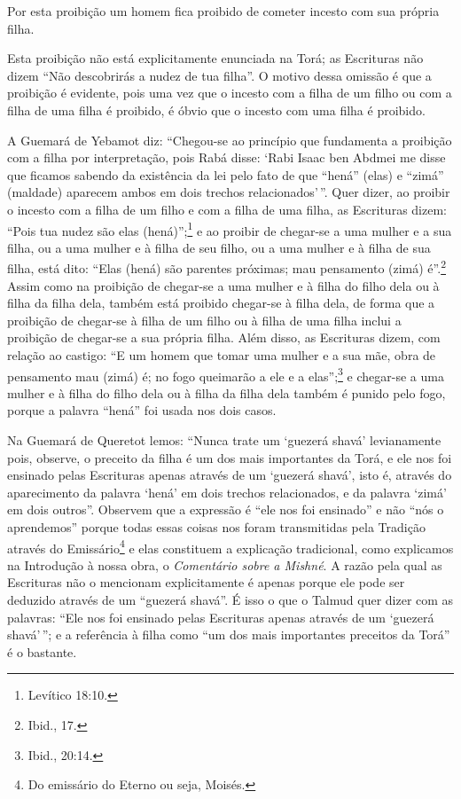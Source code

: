Por esta proibição um homem fica proibido de cometer incesto com sua
própria filha.

Esta proibição não está explicitamente enunciada na Torá; as
Escrituras não dizem ``Não descobrirás a nudez de tua filha''. O motivo
dessa omissão é que a proibição é evidente, pois uma vez que o incesto
com a filha de um filho ou com a filha de uma filha é proibido, é óbvio
que o incesto com uma filha é proibido.

A Guemará de Yebamot diz: ``Chegou-se ao princípio que fundamenta a
proibição com a filha por interpretação, pois Rabá disse: `Rabi Isaac
ben Abdmei me disse que ficamos sabendo da existência da lei pelo fato
de que ``hená'' (elas) e ``zimá'' (maldade) aparecem ambos em dois
trechos relacionados'\,''. Quer dizer, ao proibir o incesto com a filha de
um filho e com a filha de uma filha, as Escrituras dizem: ``Pois tua
nudez são elas (hená)'';\footnote{Levítico 18:10.} e ao proibir de chegar-se a
uma mulher e a sua filha, ou a uma mulher e à filha de seu filho, ou a
uma mulher e à filha de sua filha, está dito: ``Elas (hená) são parentes
próximas; mau pensamento (zimá) é''.\footnote{Ibid., 17.} Assim como na proibição
de chegar-se a uma mulher e à filha do filho dela ou à filha da filha
dela, também está proibido chegar-se à filha dela, de forma que a
proibição de chegar-se à filha de um filho ou à filha de uma filha
inclui a proibição de chegar-se a sua própria filha. Além disso, as
Escrituras dizem, com relação ao castigo: ``E um homem que tomar uma
mulher e a sua mãe, obra de pensamento mau (zimá) é; no fogo queimarão a
ele e a elas'';\footnote{Ibid., 20:14.} e chegar-se a uma mulher e à filha do
filho dela ou à filha da filha dela também é punido pelo fogo, porque a
palavra ``hená'' foi usada nos dois casos.

Na Guemará de Queretot lemos: ``Nunca trate um `guezerá shavá'
levianamente pois, observe, o preceito da filha é um dos mais
importantes da Torá, e ele nos foi ensinado pelas Escrituras apenas
através de um `guezerá shavá', isto é, através do aparecimento da
palavra `hená' em dois trechos relacionados, e da palavra `zimá' em dois
outros''. Observem que a expressão é ``ele nos foi ensinado'' e não
``nós o aprendemos'' porque todas essas coisas nos foram transmitidas
pela Tradição através do Emissário\footnote{Do emissário do Eterno ou seja, Moisés.} e elas constituem a explicação tradicional, como explicamos na Introdução à
nossa obra, o \emph{Comentário sobre a Mishné}. A razão pela qual as
Escrituras não o mencionam explicitamente é apenas porque ele pode ser
deduzido através de um ``guezerá shavá''. É isso o que o Talmud quer
dizer com as palavras: ``Ele nos foi ensinado pelas Escrituras apenas
através de um `guezerá shavá'\,''; e a referência à filha como ``um dos
mais importantes preceitos da Torá'' é o bastante.

